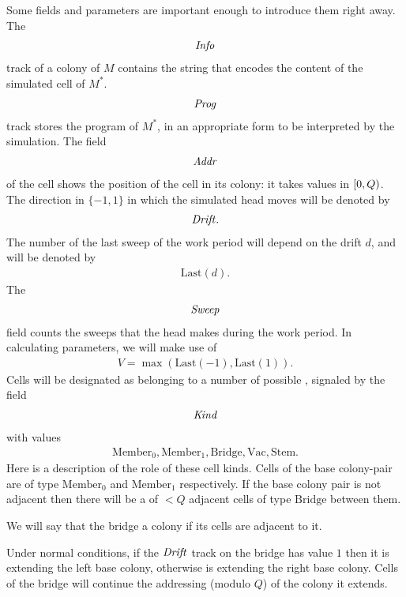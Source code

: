 \documentclass[11pt]{memoir}
\theoremstyle{definition} %
\newcommand{\fld}[1]{\ensuremath{\textit{#1\/}}}
\newcommand{\Vacant}{\mathrm{Vac}}
\newcommand{\Q}{Q}
\newcommand{\V}{V}
\newcommand{\Addr}{\fld{Addr}}
\newcommand{\Drift}{\fld{Drift}}
\newcommand{\Info}{\fld{Info}}
\newcommand{\Kind}{\fld{Kind}}
\newcommand{\Prog}{\fld{Prog}}
\newcommand{\Sweep}{\fld{Sweep}}
\newcommand{\Bridge}{\mathrm{Bridge}}
\newcommand{\Last}{\mathrm{Last}}
\newcommand{\Member}{\mathrm{Member}}
\newcommand{\Stem}{\mathrm{Stem}}
\begin{document}
Some fields and parameters are important enough to introduce them right away.
The 
\begin{align*}
   \Info
 \end{align*}
track of a colony of \( M \)
contains the string that encodes the content of the simulated cell of \( M^{*} \).
\begin{align*}
 \Prog
 \end{align*}
track stores the program of \( M^{*} \), in an appropriate form 
to be interpreted by the simulation.
The field 
 \begin{align*}
  \Addr
 \end{align*}
of the cell shows the position of the cell in its colony:
it takes values in \( \left[0,Q\right) \).
The direction in \( \{-1,1\} \) in which the simulated head moves will be denoted by
 \begin{align*}
   \Drift.
 \end{align*}
The number of the last sweep of the work period will depend on the drift \( d \), 
and will be denoted by 
\begin{align}\label{eq:Last}
   \Last(d).
 \end{align}
The
 \begin{align*}
 \Sweep
 \end{align*}
field counts the sweeps that the head makes during the work period.
In calculating parameters, we will make use of  
\begin{align}\label{eq:V}
   \V=\max(\Last(-1),\Last(1)).
 \end{align}
Cells will be designated as belonging to a number of possible , signaled by the
field 
\begin{align*}
     \Kind
 \end{align*}
with values
\begin{align*}
          \Member_{0},\Member_{1},\Bridge,\Vacant, \Stem.
\end{align*}
Here is a description of the role of these cell kinds.
Cells of the base colony-pair are of type \( \Member_{0} \) and \( \Member_{1} \) respectively.
If the base colony pair is not adjacent then there will be a  of \( <\Q \)
adjacent cells of type \( \Bridge \) between them.

\begin{definition}\label{def:extends}
We will say that the bridge  a colony if its cells are adjacent to it.  
\end{definition}
Under normal conditions,  
if the \( \Drift \) track on the bridge has value \( 1 \) then it is extending the left base
colony, otherwise is extending the right base colony.
Cells of the bridge will continue the addressing (modulo \( \Q \)) of the colony it extends.
\end{document}
